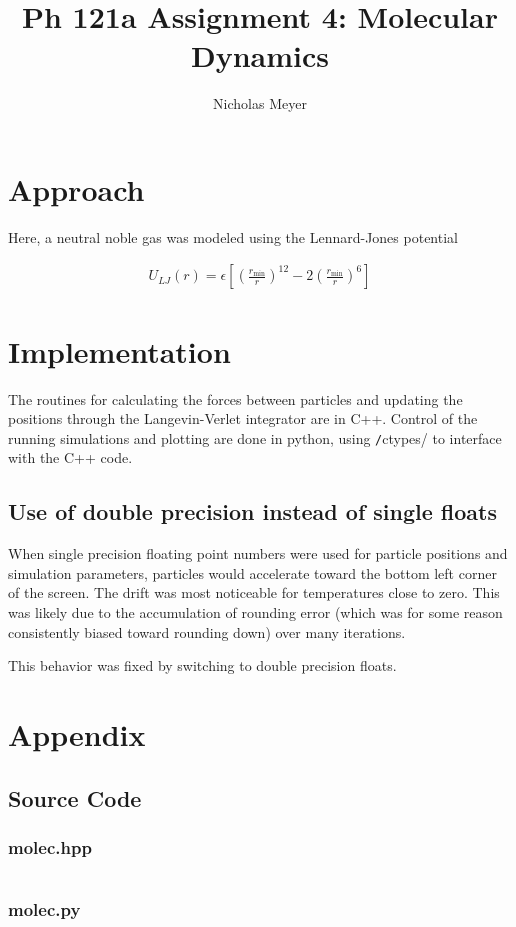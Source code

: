 \documentclass[12pt]{article}
\begin{document}
\title{Ph 121a Assignment 4: Molecular Dynamics}
\author{Nicholas Meyer}

\maketitle

\section{Approach}

Here, a neutral noble gas was modeled using the Lennard-Jones potential

\begin{align}
  U_{LJ}(r) = \epsilon \left[\left(\frac{r_{\text{min}}}{r}\right)^{12}
  - 2\left(\frac{r_{\text{min}}}{r}\right)^6\right]
\end{align}

\section{Implementation}

The routines for calculating the forces between particles and updating the
positions through the Langevin-Verlet integrator are in C++.
Control of the running simulations and plotting are done in python, using
\texttt/ctypes/ to interface with the C++ code.

\subsection{Use of double precision instead of single floats}

When single precision floating point numbers were used for particle positions
and simulation parameters, particles would accelerate toward the bottom left
corner of the screen. The drift was most noticeable for temperatures close to
zero. This was likely due to the accumulation of rounding error (which was
for some reason consistently biased toward rounding down) over many
iterations.

This behavior was fixed by switching to double precision floats.

\section*{Appendix}

\subsection*{Source Code}

\subsubsection*{molec.hpp}

\inputminted{c++}{molec.hpp}

\newpage

\subsubsection*{molec.py}

\inputminted{python}{molec.py}
\end{document}
